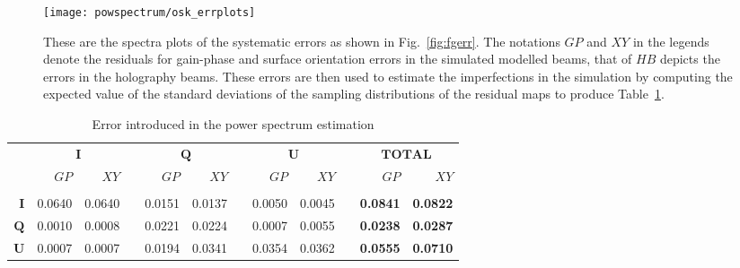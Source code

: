  \begin{figure}
\begin{minipage}[H]{\linewidth}
      \centering
      \texttt{[image: powspectrum/osk\_errplots]}
      \end{minipage}
    \caption{These are the spectra plots of the systematic errors as shown in Fig.~\ref{fig:fgerr}. 
   The notations $GP$ and $XY$ in the legends denote the residuals for gain-phase and surface orientation errors in the simulated modelled beams, that of $HB$ depicts the errors  in the holography beams. These errors are then used to estimate the imperfections in the simulation by computing the expected value of the standard deviations of the sampling distributions of the residual maps to produce Table~\ref{tbl:excel-table}.}\label{fig:sperr}
\end{figure}
\FloatBarrier
% 
\begin{table}[H]\centering
\caption{Error introduced in the power spectrum estimation} 
\label{tbl:excel-table}
\begin{tabular}{@{}rrrcrrcrrcrr@{}}\toprule
& \multicolumn{2}{c}{$\bm{I}$} & \phantom{abc}& \multicolumn{2}{c}{$\bm{Q}$} & \phantom{abc} & \multicolumn{2}{c}{$\bm{U}$} & \phantom{abc} & \multicolumn{2}{c}{$\bm{TOTAL}$}\\
\cmidrule{2-3}  \cmidrule{5-6} \cmidrule{8-9} \cmidrule{11-12}
 & $GP $ & $XY $ && $GP$ & $XY $  && $GP $ & $XY $  && $GP$ & $XY $ \\ \midrule
{}\\
$\bm{I}$ & 0.0640 & 0.0640 && 0.0151 & 0.0137  && 0.0050 & 0.0045 && \textbf{0.0841} & \textbf{0.0822}\\
$\bm{Q}$ & 0.0010 & 0.0008 && 0.0221 & 0.0224 && 0.0007 & 0.0055 && \textbf{0.0238} & \textbf{0.0287}\\
$\bm{U}$ & 0.0007 & 0.0007 && 0.0194 & 0.0341 && 0.0354 & 0.0362  && \textbf{0.0555} & \textbf{0.0710}\\
\bottomrule
\end{tabular}
\end{table}
 \FloatBarrier     

